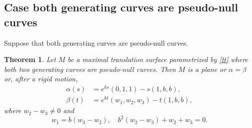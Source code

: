 \documentclass[a4paper,12pt]{amsart}
\numberwithin{equation}{section}
\newtheorem{theorem}{Theorem}[section]
\theoremstyle{definition}
\begin{document}
\subsection{Case both generating curves are pseudo-null curves}\label{s32}

Suppose that both generating curves are  pseudo-null curves. 

\begin{theorem}\label{t34}
 Let $M$ be a maximal translation surface parametrized by \eqref{tt} where  both two generating curves are pseudo-null curves. Then $M$ is a plane or $\alpha=\beta$ or, after a rigid motion, 
  \begin{equation*}
 \begin{split}
 \alpha(s)&=e^{ks}(0,1,1)-s(1,b,b),\\
 \beta(t)&=e^{kt}(w_1,w_2,w_3)-t( 1,b,b),
 \end{split}
 \end{equation*}
 where $w_2-w_3\not=0$ and 
 $$w_1= b(w_3-w_2) ,\quad b^2(w_2-w_3)+ w_2+w_3=0.$$
\end{theorem}
\end{document}
